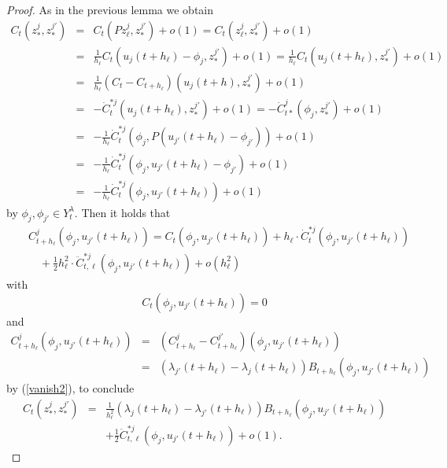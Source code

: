 \documentclass[final,a4paper]{jmsj}
\theoremstyle{thmstyleone}%
\theoremstyle{thmstyletwo}%
\theoremstyle{thmstylethree}%
\begin{document}
\begin{proof} 
As in the previous lemma we obtain    
\begin{eqnarray*} 
 C_t(z_\ast^j, z_\ast^{j'}) & = & C_t(Pz_\ell^j, z_\ast^{j'})+o(1)=C_t(z_\ell^j, z_\ast^{j'})+o(1) \\ 
& = & \frac{1}{h_\ell}C_t(u_j(t+h_\ell)-\phi_j, z_\ast^{j'})+o(1)=\frac{1}{h_\ell}C_t(u_j(t+h_\ell), z_\ast^{j'})+o(1) \\ 
& = & \frac{1}{h_\ell}(C_t-C_{t+h_\ell})(u_j(t+h), z_\ast^{j'})+o(1) \\ 
& = & -\dot C_{t}^{\ast j}(u_j(t+h_\ell), z_\ast^{j'})+o(1)=-\dot C_{t\ast}^j(\phi_j, z_\ast^{j'})+o(1) \\ 
& = & -\frac{1}{h_\ell}\dot C_{t}^{\ast j}(\phi_j, P(u_{j'}(t+h_\ell)-\phi_{j'}))+o(1) \\ 
& = & -\frac{1}{h_\ell}\dot C_{t}^{\ast j}(\phi_j, u_{j'}(t+h_\ell)-\phi_{j'})+o(1) \\ 
& = & -\frac{1}{h_\ell}\dot C_{t}^{\ast j}(\phi_j, u_{j'}(t+h_\ell))+o(1)  
\end{eqnarray*} 
by $\phi_j, \phi_{j'}\in Y_t^\lambda$. Then it holds that 
\begin{eqnarray*} 
& & C_{t+h_\ell}^j(\phi_j, u_{j'}(t+h_\ell))=C_t(\phi_j, u_{j'}(t+h_\ell))+h_\ell \cdot \dot C_{t}^{\ast j}(\phi_j, u_{j'}(t+h_\ell)) \\ 
& & \quad +\frac{1}{2}h_\ell^2 \cdot \ddot C_{t,\ell}^{\ast j}(\phi_j, u_{j'}(t+h_\ell))+o(h_\ell^2) 
\end{eqnarray*} 
with 
\[ C_t(\phi_j, u_{j'}(t+h_\ell))=0 \] 
and 
\begin{eqnarray*} 
C^j_{t+h_\ell}(\phi_j, u_{j'}(t+h_\ell)) & = & (C_{t+h_\ell}^j-C_{t+h_\ell}^{j'})(\phi_j, u_{j'}(t+h_\ell)) \\ 
& = & (\lambda_{j'}(t+h_\ell)-\lambda_j(t+h_\ell))B_{t+h_\ell}(\phi_j, u_{j'}(t+h_\ell)) 
\end{eqnarray*} 
by (\ref{vanish2}), to conclude 
\begin{eqnarray} 
C_t(z_\ast^j, z_\ast^{j'}) & = & \frac{1}{h_\ell^2}(\lambda_{j}(t+h_\ell)-\lambda_{j'}(t+h_\ell))B_{t+h_\ell}(\phi_j, u_{j'}(t+h_\ell)) \nonumber\\ 
& & +\frac{1}{2}\ddot C_{t,\ell}^{\ast j}(\phi_j, u_{j'}(t+h_\ell))+o(1). 
 \label{csecond}  
\end{eqnarray} 


\end{proof}
\end{document}
